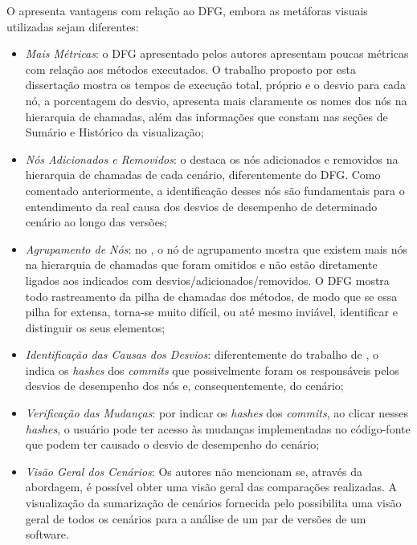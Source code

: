 O {\textit{\toolName}} apresenta vantagens com relação ao DFG, embora as metáforas visuais utilizadas sejam diferentes:
\begin{itemize}
   \item \textit{Mais Métricas}: o DFG apresentado pelos autores apresentam poucas métricas com relação aos métodos executados. O trabalho proposto por esta dissertação mostra os tempos de execução total, próprio e o desvio para cada nó, a porcentagem do desvio, apresenta mais claramente os nomes dos nós na hierarquia de chamadas, além das informações que constam nas seções de Sumário e Histórico da visualização;
   \item \textit{Nós Adicionados e Removidos}: o {\textit{\toolName}} destaca os nós adicionados e removidos na hierarquia de chamadas de cada cenário, diferentemente do DFG. Como comentado anteriormente, a identificação desses nós são fundamentais para o entendimento da real causa dos desvios de desempenho de determinado cenário ao longo das versões;
   \item \textit{Agrupamento de Nós}: no {\textit{\toolName}}, o nó de agrupamento mostra que existem mais nós na hierarquia de chamadas que foram omitidos e não estão diretamente ligados aos indicados com desvios/adicionados/removidos. O DFG mostra todo rastreamento da pilha de chamadas dos métodos, de modo que se essa pilha for extensa, torna-se muito difícil, ou até mesmo inviável, identificar e distinguir os seus elementos;
   \item \textit{Identificação das Causas dos Desvios}: diferentemente do trabalho de \citeauthor{Bezemer2015}, o {\textit{\toolName}} indica os \textit{hashes} dos \textit{commits} que possivelmente foram os responsáveis pelos desvios de desempenho dos nós e, consequentemente, do cenário;
   \item \textit{Verificação das Mudanças}: por indicar os \textit{hashes} dos \textit{commits}, ao clicar nesses \textit{hashes}, o usuário pode ter acesso às mudanças implementadas no código-fonte que podem ter causado o desvio de desempenho do cenário;
   \item \textit{Visão Geral dos Cenários}: Os autores não mencionam se, através da abordagem, é possível obter uma visão geral das comparações realizadas. A visualização da sumarização de cenários fornecida pelo {\textit{\toolName}} possibilita uma visão geral de todos os cenários para a análise de um par de versões de um software.
\end{itemize}